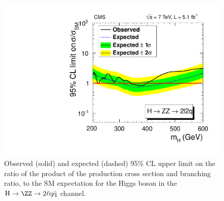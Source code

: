 
\begin{figure}[htbp]
\begin{center}
\includegraphics[width=0.6\linewidth]{figures/ZZ2l2qLimit.pdf}
\caption{
Observed (solid) and expected (dashed) 95\% CL upper limit on the ratio of the product of the production cross section
and branching ratio, to the SM expectation for the Higgs boson in the $\mathrm{H} \to \ZZ \to 2\ell \mathrm{q\bar{q}}$ channel.
}
\label{fig:ZZ2l2qlimit}
\end{center}
\end{figure}

